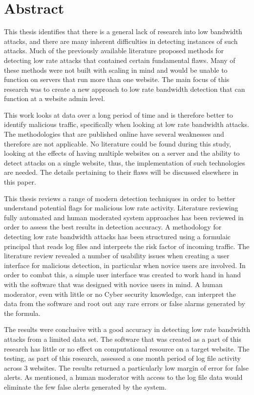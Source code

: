
\chapter{Abstract}

This thesis identifies that there is a general lack of research into low bandwidth attacks, and there are many inherent difficulties in detecting instances of such attacks. Much of the previously available literature proposed methods for detecting low rate attacks that contained certain fundamental flaws. Many of these methods were not built with scaling in mind and would be unable to function on servers that run more than one website. The main focus of this research was to create a new approach to low rate bandwidth detection that can function at a website admin level.

This work looks at data over a long period of time and is therefore better to identify malicious traffic, specifically when looking at low rate bandwidth attacks. The methodologies that are published online have several weaknesses and therefore are not applicable. No literature could be found during this study, looking at the effects of having multiple websites on a server and the ability to detect attacks on a single website, thus, the implementation of such technologies are needed. The details pertaining to their flaws will be discussed elsewhere in this paper.

This thesis reviews a range of modern detection techniques in order to better understand potential flags for malicious low rate activity. Literature reviewing fully automated and human moderated system approaches has been reviewed in order to assess the best results in detection accuracy. A methodology for detecting low rate bandwidth attacks has been structured using a formulaic principal that reads log files and interprets the risk factor of incoming traffic. The literature review revealed a number of usability issues when creating a user interface for malicious detection, in particular when novice users are involved. In order to combat this, a simple user interface was created to work hand in hand with the software that was designed with novice users in mind. A human moderator, even with little or no Cyber security knowledge, can interpret the data from the software and root out any rare errors or false alarms generated by the formula.

The results were conclusive with a good accuracy in detecting low rate bandwidth attacks from a limited data set. The software that was created as a part of this research has little or no effect on computational resource on a target website. The testing, as part of this research, assessed a one month period of log file activity across 3 websites. The results returned a particularly low margin of error for false alerts. As mentioned, a human moderator with access to the log file data would eliminate the few false alerts generated by the system.
